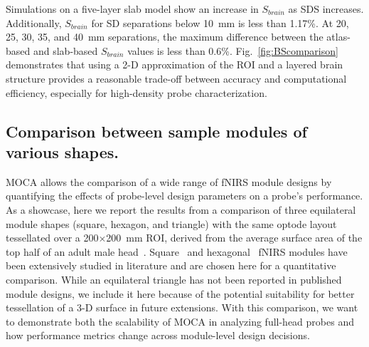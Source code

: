 Simulations on a five-layer slab model show an increase in $S_{brain}$ as SDS increases. Additionally, $S_{brain}$ for SD separations below 10~mm is less than 1.17\%. At 20, 25, 30, 35, and 40~mm separations, the maximum difference between the atlas-based and slab-based $S_{brain}$ values is less than 0.6\%. Fig.~\ref{fig:BScomparison} demonstrates that using a 2-D approximation of the ROI and a layered brain structure provides a reasonable trade-off between accuracy and computational efficiency, especially for high-density probe characterization.

\subsection{Comparison between sample modules of various shapes.}
\label{subsec:comparison}
MOCA allows the comparison of a wide range of \ac{fNIRS} module designs by quantifying the effects of probe-level design parameters on a probe's performance. As a showcase, here we report the results from a comparison of three equilateral module shapes (square, hexagon, and triangle) with the same optode layout tessellated over a 200$\times$200~mm ROI, derived from the average surface area of the top half of an adult male head~\cite{McConville1980}. Square~\cite{Chitnis2016, Bci2017, Zimmermann2013} and hexagonal~\cite{Funane2017, Wyser2017, Zhao2019} \ac{fNIRS} modules have been extensively studied in literature and are chosen here for a quantitative comparison. While an equilateral triangle has not been reported in published module designs, we include it here because of the potential suitability for better tessellation of a 3-D surface in future extensions. With this comparison, we want to demonstrate both the scalability of MOCA in analyzing full-head probes and how performance metrics change across module-level design decisions.

